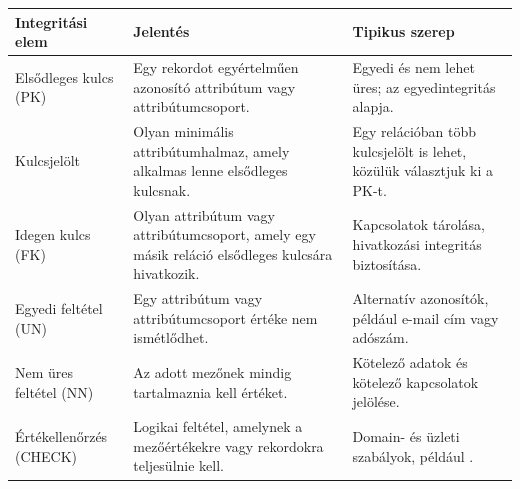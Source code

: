 \begin{tabularx}{\textwidth}{L{31mm}X X}
\toprule
\textbf{Integritási elem} & \textbf{Jelentés} & \textbf{Tipikus szerep} \\
\midrule
Elsődleges kulcs (PK) & Egy rekordot egyértelműen azonosító attribútum vagy attribútumcsoport. & Egyedi és nem lehet üres; az egyedintegritás alapja. \\
Kulcsjelölt & Olyan minimális attribútumhalmaz, amely alkalmas lenne elsődleges kulcsnak. & Egy relációban több kulcsjelölt is lehet, közülük választjuk ki a PK-t. \\
Idegen kulcs (FK) & Olyan attribútum vagy attribútumcsoport, amely egy másik reláció elsődleges kulcsára hivatkozik. & Kapcsolatok tárolása, hivatkozási integritás biztosítása. \\
Egyedi feltétel (UN) & Egy attribútum vagy attribútumcsoport értéke nem ismétlődhet. & Alternatív azonosítók, például e-mail cím vagy adószám. \\
Nem üres feltétel (NN) & Az adott mezőnek mindig tartalmaznia kell értéket. & Kötelező adatok és kötelező kapcsolatok jelölése. \\
Értékellenőrzés (CHECK) & Logikai feltétel, amelynek a mezőértékekre vagy rekordokra teljesülnie kell. & Domain- és üzleti szabályok, például . \\
\bottomrule
\end{tabularx}
